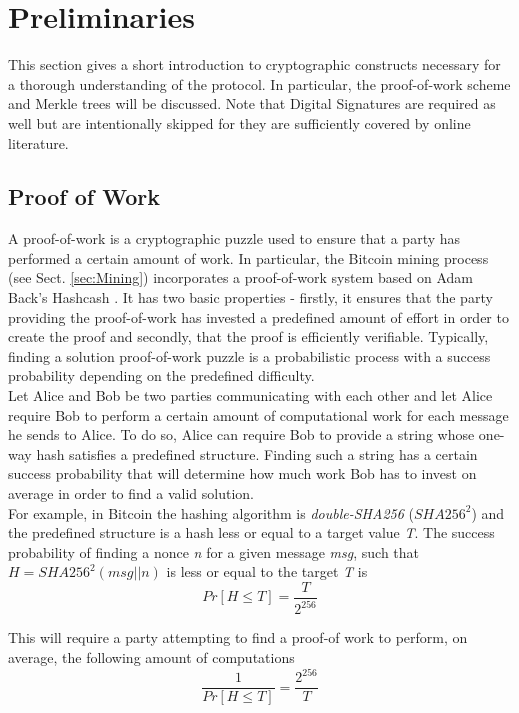 \section{Preliminaries} \label{sec:Preliminaries}
This section gives a short introduction to cryptographic constructs necessary for a thorough understanding of the protocol. In particular, the proof-of-work scheme and Merkle trees will be discussed. Note that Digital Signatures are required as well but are intentionally skipped for they are sufficiently covered by online literature.

\subsection{Proof of Work} \label{sec:ProofOfWork}
A proof-of-work is a cryptographic puzzle used to ensure that a party has performed a certain amount of work. In particular, the Bitcoin mining process (see Sect. \ref{sec:Mining}) incorporates a proof-of-work system based on Adam Back's Hashcash \cite{Back_Hashcash}. It has two basic properties - firstly, it ensures that the party providing the proof-of-work has invested a predefined amount of effort in order to create the proof and secondly, that the proof is efficiently verifiable. Typically, finding a solution proof-of-work puzzle is a probabilistic process with a success probability depending on the predefined difficulty.~\\

\noindent
Let Alice and Bob be two parties communicating with each other and let Alice require Bob to perform a certain amount of computational work for each message he sends to Alice. To do so, Alice can require Bob to provide a string whose one-way hash satisfies a predefined structure. Finding such a string has a certain success probability that will determine how much work Bob has to invest on average in order to find a valid solution.~\\

\noindent
For example, in Bitcoin the hashing algorithm is \emph{double-SHA256} ($\mathit{SHA256^{2}}$) and the predefined structure is a hash less or equal to a target value \emph{T}. The success probability of finding a nonce \emph{n} for a given message \emph{msg}, such that $\mathit{H = SHA256^{2}(msg||n)}$ is less or equal to the target \emph{T} is
\begin{equation}
Pr[H \leq T] = \frac{T}{2^{256}}
\end{equation}

\newpage
\noindent
This will require a party attempting to find a proof-of work to perform, on average, the following amount of computations
\begin{equation}
\frac{1}{Pr[H \leq T]} = \frac{2^{256}}{T}
\end{equation}

